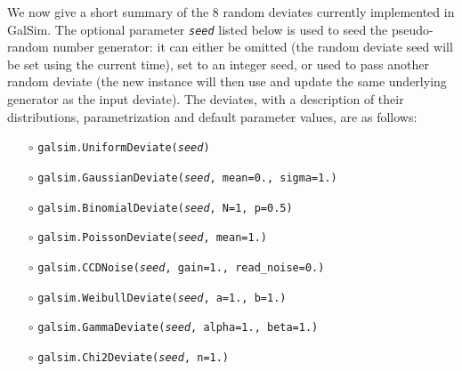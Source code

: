 \documentclass[preprint,11pt]{../../devel/modules/aastex}
\begin{document}
We now give a short summary of the 8 random deviates currently
implemented in GalSim.   The optional parameter \emph{\texttt{seed}}
listed below is used
to seed the pseudo-random number generator: it can
either be omitted (the random deviate seed will be set using the
current time), set to an integer seed, or used to pass another random
deviate (the new instance will then use and update the same underlying
generator as the input deviate).
The deviates, with a description of their distributions, parametrization and
default parameter values, are as follows:
\begin{itemize}

\item[$\circ$] \texttt{galsim.UniformDeviate(\emph{seed})} \newline {uniform distribution in the
  interval $[0, 1)$.}

\item[$\circ$] \texttt{galsim.GaussianDeviate(\emph{seed}, mean=0., sigma=1.)} 

\item[$\circ$] \texttt{galsim.BinomialDeviate(\emph{seed}, N=1, p=0.5)} 

\item[$\circ$] \texttt{galsim.PoissonDeviate(\emph{seed}, mean=1.)} 

\item[$\circ$] \texttt{galsim.CCDNoise(\emph{seed}, gain=1., read\_noise=0.)}  

\item[$\circ$] \texttt{galsim.WeibullDeviate(\emph{seed}, a=1., b=1.)} 

\item[$\circ$] \texttt{galsim.GammaDeviate(\emph{seed}, alpha=1., beta=1.)} 

\item[$\circ$] \texttt{galsim.Chi2Deviate(\emph{seed}, n=1.)} 

\end{itemize}
\end{document}
